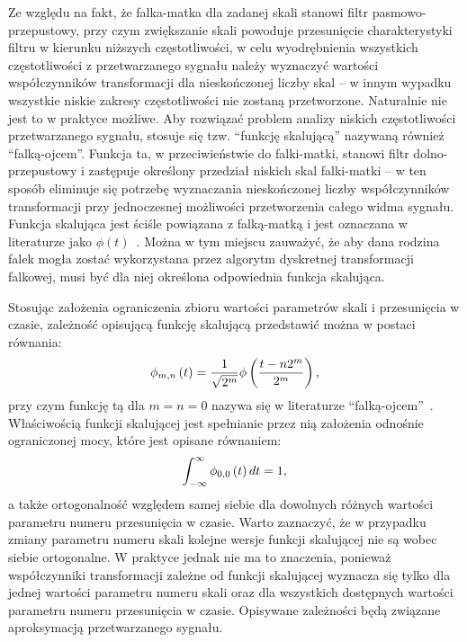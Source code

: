 Ze względu na fakt, że falka-matka dla zadanej skali stanowi filtr pasmowo-przepustowy, przy czym zwiększanie skali powoduje przesunięcie charakterystyki filtru w kierunku niższych częstotliwości, w celu wyodrębnienia wszystkich częstotliwości z przetwarzanego sygnału należy wyznaczyć wartości współczynników transformacji dla nieskończonej liczby skal -- w innym wypadku wszystkie niskie zakresy częstotliwości nie zostaną przetworzone. Naturalnie nie jest to w praktyce możliwe. Aby rozwiązać problem analizy niskich częstotliwości przetwarzanego sygnału, stosuje się tzw. \enquote{funkcję skalującą} nazywaną również \enquote{falką-ojcem}. Funkcja ta, w przeciwieństwie do falki-matki, stanowi filtr dolno-przepustowy i zastępuje określony przedział niskich skal falki-matki -- w ten sposób eliminuje się potrzebę wyznaczania nieskończonej liczby współczynników transformacji przy jednoczesnej możliwości przetworzenia całego widma sygnału. Funkcja skalująca jest ściśle powiązana z falką-matką i jest oznaczana w literaturze jako $\phi(t)$~\cite{wallen_handbook}. Można w tym miejscu zauważyć, że aby dana rodzina falek mogła zostać wykorzystana przez algorytm dyskretnej transformacji falkowej, musi być dla niej określona odpowiednia funkcja skalująca.

Stosując założenia ograniczenia zbioru wartości parametrów skali i przesunięcia w czasie, zależność opisującą funkcję skalującą przedstawić można w postaci równania:
\begin{equation}
\phi_{m,n} \left(t\right) = \frac{1}{\sqrt{2^{m}}} \phi \left(\frac{t - n 2^{m}}{2^{m}}\right) \label{eq:dwt_scalefun},
\end{equation}
przy czym funkcję tą dla $m = n = 0$ nazywa się w literaturze \enquote{falką-ojcem}~\cite{akujuobi_applications}. Właściwością funkcji skalującej jest spełnianie przez nią założenia odnośnie ograniczonej mocy, które jest opisane równaniem:
\begin{equation}
\int _{-\infty} ^{\infty} \phi_{0,0} \left(t\right) dt = 1 \label{eq:dwt_fatherwav},
\end{equation}
a także ortogonalność względem samej siebie dla dowolnych różnych wartości parametru numeru przesunięcia w czasie. Warto zaznaczyć, że w przypadku zmiany parametru numeru skali kolejne wersje funkcji skalującej nie są wobec siebie ortogonalne. W praktyce jednak nie ma to znaczenia, ponieważ współczynniki transformacji zależne od funkcji skalującej wyznacza się tylko dla jednej wartości parametru numeru skali oraz dla wszystkich dostępnych wartości parametru numeru przesunięcia w czasie. Opisywane zależności będą związane aproksymacją przetwarzanego sygnału.

